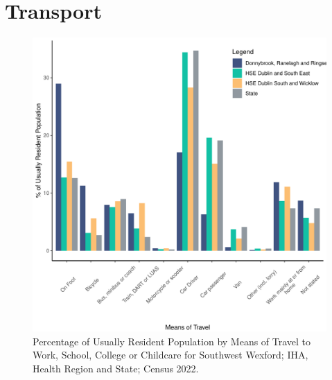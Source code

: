 \documentclass{article}
\begin{document}
\section{Transport}\label{sect:Trans}
\begin{figure}[H]
	\centering
	\includegraphics[width = 120mm]{../figures/TravelED.pdf}
	\caption{Percentage of Usually Resident Population by Means of Travel to Work, School, College or Childcare for Southwest Wexford; IHA, Health Region and State; Census 2022.}
	\label{fig:vbnv}
	\end{figure}
\end{document}
